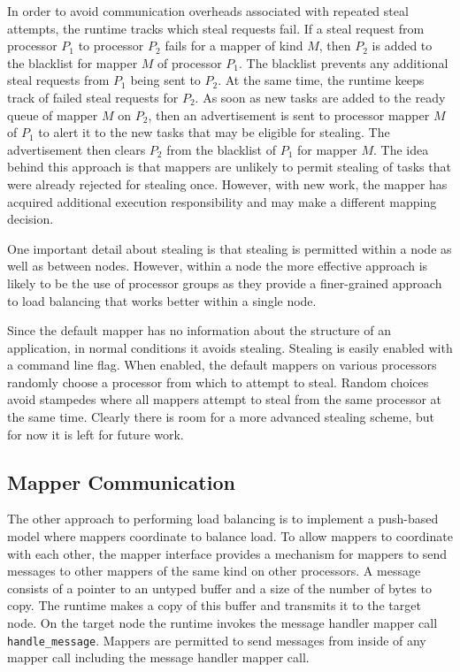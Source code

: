 In order to avoid communication overheads 
associated with repeated steal attempts, the
runtime tracks which steal requests fail.
If a steal request from processor $P_1$ to
processor $P_2$ fails for a mapper of kind
$M$, then $P_2$ is added to the blacklist
for mapper $M$ of processor $P_1$. The blacklist
prevents any additional steal requests from
$P_1$ being sent to $P_2$. At the same time,
the runtime keeps track of failed steal
requests for $P_2$. As soon as new tasks are
added to the ready queue of mapper $M$ on 
$P_2$, then an advertisement is sent to 
processor mapper $M$ of $P_1$ to alert it
to the new tasks that may be eligible for
stealing.  The advertisement then clears
$P_2$ from the blacklist of $P_1$ for mapper
$M$. The idea behind this approach
is that mappers are unlikely to permit stealing
of tasks that were already rejected for 
stealing once.  However, with new work, the
mapper has acquired additional execution
responsibility and may make a different
mapping decision.

One important detail about stealing is that
stealing is permitted within a node as well
as between nodes. However, within a node
the more effective approach is likely to be
the use of processor groups as they provide
a finer-grained approach to load balancing
that works better within a single node.

Since the default mapper has no information about
the structure of an application, in normal
conditions it avoids stealing.  Stealing is easily 
enabled with a command line flag.  When enabled,
the default mappers on various processors randomly
choose a processor from which to attempt to steal.
Random choices avoid stampedes where all mappers
attempt to steal from the same processor at
the same time. Clearly there is room for a more
advanced stealing scheme, but for now it is
left for future work.

\subsection{Mapper Communication}
\label{subsec:mapcom}
The other approach to performing load balancing
is to implement a push-based model where mappers
coordinate to balance load. To allow mappers to
coordinate with each other, the mapper interface
provides a mechanism for mappers to send messages
to other mappers of the same kind on other
processors. A message consists of a pointer to an
untyped buffer and a size of the number of bytes
to copy.  The runtime makes a copy of this buffer
and transmits it to the target node.  On the
target node the runtime invokes the message 
handler mapper call {\tt handle\_message}. Mappers
are permitted to send messages from inside
of any mapper call including the message handler
mapper call. 

